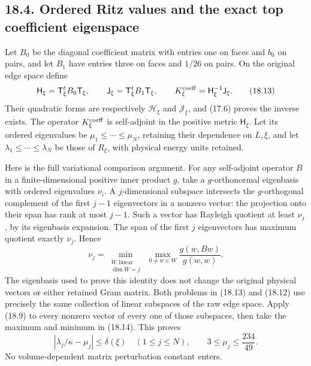 \documentclass[
]{article}
\begin{document}
\subsection{18.4. Ordered Ritz values and the exact top coefficient
eigenspace}\label{ordered-ritz-values-and-the-exact-top-coefficient-eigenspace}

Let \(B_0\) be the diagonal coefficient matrix with entries one on faces
and \(b_0\) on pairs, and let \(B_1\) have entries three on faces and
\(1/26\) on pairs. On the original edge space define \[
\mathsf H_\xi=\mathsf T_\xi^tB_0\mathsf T_\xi,\qquad
\mathsf J_\xi=\mathsf T_\xi^tB_1\mathsf T_\xi,
\qquad K^{\rm coeff}_\xi=\mathsf H_\xi^{-1}\mathsf J_\xi.
                                                               \tag{18.13}
\] Their quadratic forms are respectively \(\mathcal H_\xi\) and
\(\mathcal J_\xi\), and (17.6) proves the inverse exists. The operator
\(K^{\rm coeff}_\xi\) is self-adjoint in the positive metric
\(\mathsf H_\xi\). Let its ordered eigenvalues be
\(\mu_1\le\cdots\le\mu_N\), retaining their dependence on \(L,\xi\), and
let \(\lambda_1\le\cdots\le\lambda_N\) be those of \(R_\xi\), with
physical energy units retained.

Here is the full variational comparison argument. For any self-adjoint
operator \(B\) in a finite-dimensional positive inner product \(g\),
take a \(g\)-orthonormal eigenbasis with ordered eigenvalues \(\nu_i\).
A \(j\)-dimensional subspace intersects the \(g\)-orthogonal complement
of the first \(j-1\) eigenvectors in a nonzero vector: the projection
onto their span has rank at most \(j-1\). Such a vector has Rayleigh
quotient at least \(\nu_j\), by its eigenbasis expansion. The span of
the first \(j\) eigenvectors has maximum quotient exactly \(\nu_j\).
Hence \[
\nu_j=\min_{\substack{W\text{ linear}\\\dim W=j}}
       \ \max_{0\ne w\in W}\frac{g(w,Bw)}{g(w,w)}.
                                                               \tag{18.14}
\] The eigenbasis used to prove this identity does not change the
original physical vectors or either retained Gram matrix. Both problems
in (18.13) and (18.12) use precisely the same collection of linear
subspaces of the raw edge space. Apply (18.9) to every nonzero vector of
every one of those subspaces, then take the maximum and minimum in
(18.14). This proves \[
\boxed{\quad
|\lambda_j/\kappa-\mu_j|\le\delta(\xi)
\quad(1\le j\le N),\qquad 3\le\mu_j\le\frac{234}{49}.
\quad}                                                       \tag{18.15}
\] No volume-dependent matrix perturbation constant enters.
\end{document}
